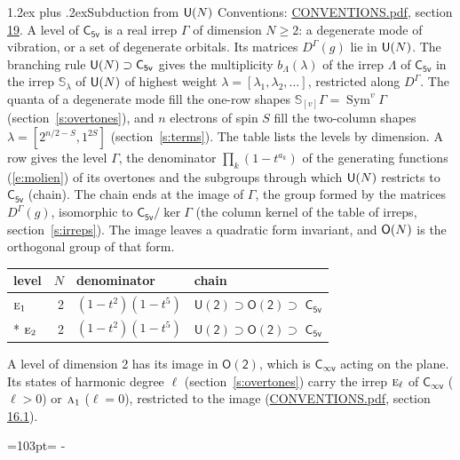 \documentclass[10pt,a4paper]{article}
\makeatletter
\renewcommand\section{\@startsection{section}{1}{\z@}{-3ex plus -1ex minus -.2ex}%
  {1.2ex plus .2ex}{\normalfont\large\sffamily\bfseries\color{parttitle}}}
\newcommand{\needspace}[1]{\par\penalty-100\begingroup\dimen0=#1\relax\dimen2=\pagegoal
  \advance\dimen2-\pagetotal\ifdim\dimen0>\dimen2\relax\ifdim\dimen2>0pt\vfil\break\fi\fi
  \endgroup}
\numberwithin{equation}{section}
\newcommand{\grp}[1]{\mathsf{#1}}
\newcommand{\irr}[1]{\text{\normalfont\scshape #1}}
\newcommand{\repD}[1]{D^{#1}}
\newcommand{\schur}[1]{\mathbb{S}_{#1}}
\newcommand{\shape}[1]{[#1]}
\makeatother
\begin{document}
\section{Subduction from \texorpdfstring{$\grp{U(\mathnormal{N})}$}{U(N)}}\label{s:unitary}
Conventions: \href{../../CONVENTIONS.pdf}{CONVENTIONS.pdf}, section \href{../../CONVENTIONS.pdf\#conv.19}{19}.
\leavevmode\label{n:local.level.dimension}A level of $\grp{C_{5v}}$ is a real irrep $\Gamma$ of dimension $N \ge 2$: a degenerate mode of vibration, or a set of degenerate orbitals. \label{n:group.unitary}Its matrices $\repD{\Gamma}(g)$ lie in $\grp{U(\mathnormal{N})}$. \label{n:irrep.schur}\label{n:shape.partition}\label{n:local.partition}\label{n:function.multiplicity.unitary}The branching rule $\grp{U(\mathnormal{N})} \supset \grp{C_{5v}}$ gives the multiplicity $b_\Lambda(\lambda)$ of the irrep $\Lambda$ of $\grp{C_{5v}}$ in the irrep $\schur{\lambda}$ of $\grp{U(\mathnormal{N})}$ of highest weight $\lambda = \shape{\lambda_1, \lambda_2, \dots}$, restricted along $\repD{\Gamma}$. \label{n:local.partition.power}\label{n:local.electrons}\label{n:local.spin}The quanta of a degenerate mode fill the one-row shapes $\schur{\shape{v}}\Gamma = \operatorname{Sym}^{v}\Gamma$ (section~\ref{s:overtones}), and $n$ electrons of spin $S$ fill the two-column shapes $\lambda = \shape{2^{n/2-S}, 1^{2S}}$ (section~\ref{s:terms}).
The table lists the levels by dimension. \label{n:head.level}\label{n:head.denominator}\label{n:index.overtone.denominator}\label{n:head.chain}A row gives the level $\Gamma$, the denominator $\prod_k (1 - t^{a_k})$ of the generating functions (\ref{e:molien}) of its overtones and the subgroups through which $\grp{U(\mathnormal{N})}$ restricts to $\grp{C_{5v}}$ (chain). The chain ends at the image of $\Gamma$, the group formed by the matrices $\repD{\Gamma}(g)$, isomorphic to $\grp{C_{5v}}/\ker\Gamma$ (the column kernel of the table of irreps, section~\ref{s:irreps}). The image leaves a quadratic form invariant, and $\grp{O(\mathnormal{N})}$ is the orthogonal group of that form.
{\small\begin{longtable}{@{}lrll@{}}\toprule
level & $N$ & denominator & chain\\\midrule\endhead
\bottomrule\endfoot\endlastfoot
$\irr{e}_{1}$ & 2 & $(1-t^{2})(1-t^{5})$ & $\grp{U(2)} \supset \grp{O(2)} \supset$ \href{C5v.pdf}{$\grp{C_{5v}}$}\\*
$\irr{e}_{2}$ & 2 & $(1-t^{2})(1-t^{5})$ & $\grp{U(2)} \supset \grp{O(2)} \supset$ \href{C5v.pdf}{$\grp{C_{5v}}$}\\
\bottomrule\end{longtable}}
A level of dimension 2 has its image in $\grp{O(2)}$, which is \href{Cinfv.pdf}{$\grp{C_{\infty v}}$} acting on the plane. \label{n:index.harmonic.degree}Its states of harmonic degree $\ell$ (section~\ref{s:overtones}) carry the irrep $\irr{e}_{\ell}$ of \href{Cinfv.pdf}{$\grp{C_{\infty v}}$} ($\ell > 0$) or $\irr{a}_{1}$ ($\ell = 0$), restricted to the image (\href{../../CONVENTIONS.pdf}{CONVENTIONS.pdf}, section \href{../../CONVENTIONS.pdf\#conv.16.1}{16.1}).
\needspace{103pt}
\end{document}

